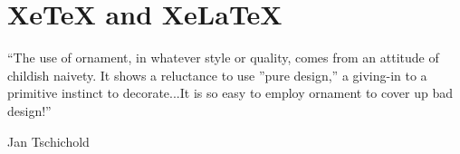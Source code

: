 
\def\reflect#1{{\setbox0=\hbox{#1}\rlap{\kern0.5\wd0
  \special{x:gsave}\special{x:scale -1 1}}\box0 \special{x:grestore}}}
\def\XeTeX{\leavevmode
  \setbox0=\hbox{X\lower.5ex\hbox{\kern-.15em\reflect{E}}\kern-.1667em \TeX}%
  \dp0=0pt\ht0=0pt\box0 }

\def\eTeX{$\varepsilon$-\TeX}
\def\TeXgX{\TeX\lower.5ex\hbox{\kern-.15em G}\kern-.25em X}
\def\extractfontname"#1"#2\relax{\edef\testa{#1}}
\def\checkfont#1#2{^^A
  \ifx#1\nullfont \message{Font "#2" not available!}\rm \else \edef\testb{\detokenize{#2}}%
  \let\x=#1\x \edef\testa{\fontname\x}\expandafter\extractfontname\testa\relax
  \ifx\testa\testb\else\errmessage{Loaded font "\testa", expected "\testb"!}\fi\fi}

\def\showfont#1#2{\tt #1&
  \edef\INT{\the\interactionmode}\interactionmode=0
  \font\x=#1 \interactionmode=\INT \relax \checkfont{\x}{#2}#2\cr}



\chapter{XeTeX and XeLaTeX}

\epigraph{“The use of ornament, in whatever style or quality, comes from an attitude of childish naivety. It shows a 
reluctance to use ”pure design,” a giving-in to a primitive instinct to decorate...It is so easy to employ ornament 
to cover up bad design!”}{Jan Tschichold}

\minitoc
{}

